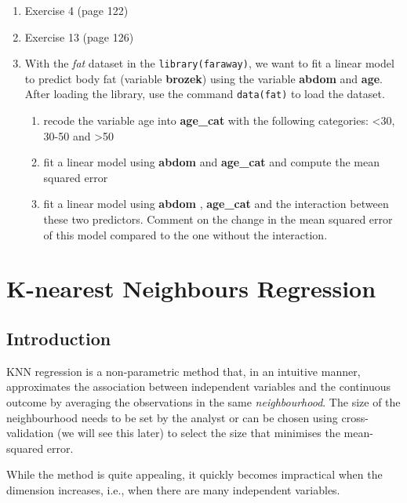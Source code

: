 \documentclass[
]{book}
\begin{document}
\begin{enumerate}
\def\labelenumi{\arabic{enumi})}
\item
  Exercise 4 (page 122)
\item
  Exercise 13 (page 126)
\item
  With the \emph{fat} dataset in the \texttt{library(faraway)}, we want to
  fit a linear model to predict body fat (variable \textbf{brozek}) using the variable
  \textbf{abdom} and \textbf{age}. After loading the library, use the command \texttt{data(fat)}
  to load the dataset.

  \begin{enumerate}
  \def\labelenumii{\alph{enumii})}
  \item
    recode the variable age into \textbf{age\_cat} with the following categories:
    \textless30, 30-50 and \textgreater50
  \item
    fit a linear model using \textbf{abdom} and \textbf{age\_cat} and compute the mean
    squared error
  \item
    fit a linear model using \textbf{abdom} , \textbf{age\_cat} and the interaction
    between these two predictors. Comment on the change in the mean
    squared error of this model compared to the one without the interaction.
  \end{enumerate}
\end{enumerate}

\chapter{K-nearest Neighbours Regression}\label{k-nearest-neighbours-regression}

\section{Introduction}\label{knn.intro}

KNN regression is a non-parametric method that, in an intuitive manner,
approximates the association between independent variables and the continuous
outcome by
averaging the observations in the same \emph{neighbourhood}. The size of the
neighbourhood needs
to be set by the analyst or can be chosen using cross-validation (we will
see this later) to select the size that minimises the
mean-squared error.

While the method is quite appealing, it quickly becomes impractical when the
dimension increases, i.e., when there are many independent variables.
\end{document}
